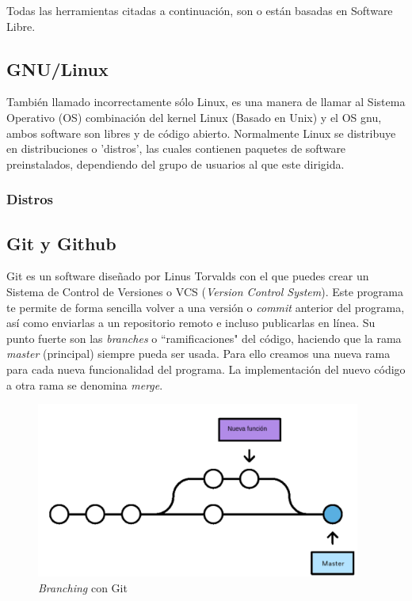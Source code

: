 \documentclass[a4paper, 11pt, twoside]{report} %
\begin{document}
Todas las herramientas citadas a continuación, son o están basadas en Software Libre.

\subsection{GNU/Linux}
También llamado incorrectamente sólo Linux, es una manera de llamar al Sistema Operativo (OS) combinación del kernel Linux (Basado en Unix) y el OS \gls{gnu}, ambos software son libres y de código abierto. Normalmente Linux se distribuye en distribuciones o 'distros', las cuales contienen paquetes de software preinstalados, dependiendo del grupo de usuarios al que este dirigida.

\subsubsection*{Distros}

\subsection{Git y Github}
Git es un software diseñado por Linus Torvalds con el que puedes crear un Sistema de Control de Versiones o VCS (\textit{Version Control System}). Este programa te permite de forma sencilla volver a una versión o \textit{commit} anterior del programa, así como enviarlas a un repositorio remoto e incluso publicarlas en línea. Su punto fuerte son las \textit{branches} o ``ramificaciones" del código, haciendo que la rama \textit{master} (principal) siempre pueda ser usada. Para ello creamos una nueva rama para cada nueva funcionalidad del programa. La implementación del nuevo código a otra rama se denomina \textit{merge}.

\begin{figure}
\includegraphics[width=0.95\textwidth]{Resources/01.01.02-01.png}
\caption{\textit{Branching} con Git}
\end{figure}
\end{document}
